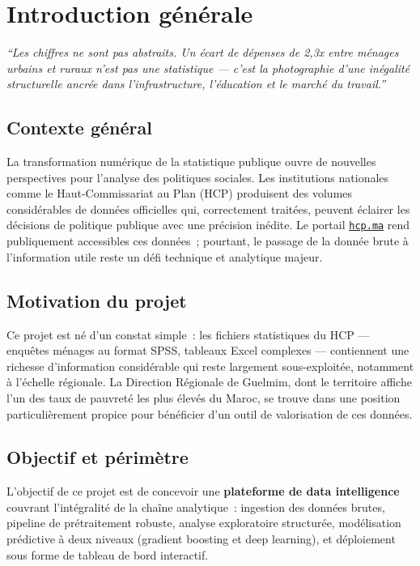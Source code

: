 \documentclass[12pt,a4paper]{report}
\begin{document}
\chapter*{Introduction générale}

\epigraph{\itshape ``Les chiffres ne sont pas abstraits. Un écart de dépenses de 2,3x entre ménages urbains et ruraux n'est pas une statistique --- c'est la photographie d'une inégalité structurelle ancrée dans l'infrastructure, l'éducation et le marché du travail.''}{}

\section*{Contexte général}

La transformation numérique de la statistique publique ouvre de nouvelles perspectives pour l'analyse des politiques sociales. Les institutions nationales comme le Haut-Commissariat au Plan (HCP) produisent des volumes considérables de données officielles qui, correctement traitées, peuvent éclairer les décisions de politique publique avec une précision inédite. Le portail \href{https://www.hcp.ma}{\texttt{hcp.ma}} rend publiquement accessibles ces données~; pourtant, le passage de la donnée brute à l'information utile reste un défi technique et analytique majeur.

\section*{Motivation du projet}

Ce projet est né d'un constat simple~: les fichiers statistiques du HCP --- enquêtes ménages au format SPSS, tableaux Excel complexes --- contiennent une richesse d'information considérable qui reste largement sous-exploitée, notamment à l'échelle régionale. La Direction Régionale de Guelmim, dont le territoire affiche l'un des taux de pauvreté les plus élevés du Maroc, se trouve dans une position particulièrement propice pour bénéficier d'un outil de valorisation de ces données.

\section*{Objectif et périmètre}

L'objectif de ce projet est de concevoir une \textbf{plateforme de data intelligence} couvrant l'intégralité de la chaîne analytique~: ingestion des données brutes, pipeline de prétraitement robuste, analyse exploratoire structurée, modélisation prédictive à deux niveaux (gradient boosting et deep learning), et déploiement sous forme de tableau de bord interactif.
\end{document}
